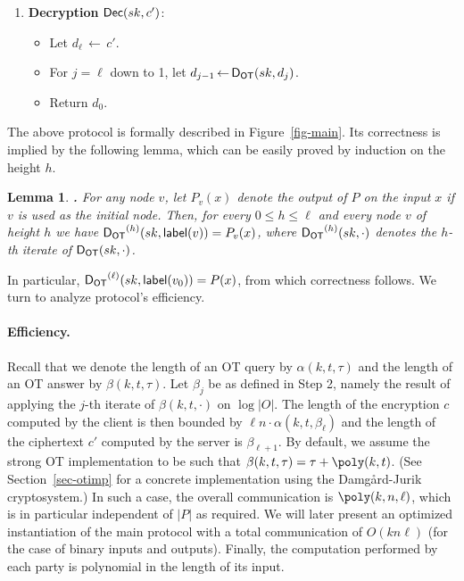 \documentclass[11pt]{article}
\newcommand{\height}{{\sf height}}
\newcommand{\ansot}{{\sf A_{OT}}}
\newcommand{\decot}{{\sf D_{OT}}}
\newcommand{\otl}{{\tau}}
\newcommand{\lab}{{\mathsf{label}}}
\newtheorem{LEMMA}{Lemma}[section]
\newenvironment{lemma}{\begin{LEMMA} \hspace{-.85em} {\bf .} \rm}%
	{\end{LEMMA}}
\newcommand{\from}{{\,\leftarrow\,}}
\newcommand{\dec}{{\sf Dec}}
\begin{document}
{\begin{enumerate}
\begin{itemize}
\begin{itemize}
children are labeled.
\item Let $i\from\psi_V(v)$ and $h\from\height(v)$.
\item Let
$\lab(v)\from \ansot(pk,q_i^h,
\lab(u_0),\ldots,\lab(u_{t-1}))$,
where $u_m$ is the (unique) node such that $m\in{\psi_E(v,u_m)}$.
\\Note that the nodes $u_m$ are not necessarily distinct.
\end{itemize}
\item Return $c'=\lab(v_0)$.
\end{itemize}
\item {\bf Decryption} $\dec(sk,c')$:
\begin{itemize}
\item Let $d_\ell\from c'$.
\item For $j=\ell$ down to 1,
let $d_{j-1}\from\decot(sk, d_j)$.
\item Return $d_0$.
\end{itemize}
\end{enumerate}
}

The above protocol is formally described in Figure~\ref{fig-main}.
Its correctness is implied by the following lemma, which can be
easily proved by induction on the height $h$.
\begin{lemma}
\label{lem-correct} For any node $v$, let $P_v(x)$ denote the output
of $P$ on the input $x$ if $v$ is used as the initial node.  Then,
for every $0\le h\le \ell$ and every node $v$ of height $h$ we have
$\decot^{(h)}(sk,\lab(v))=P_v(x)$, where $\decot^{(h)}(sk,\cdot)$
denotes the $h$-th iterate of $\decot(sk,\cdot)$.
\end{lemma}
In particular, $\decot^{(\ell)}(sk,\lab(v_0))=P(x)$, from which
correctness follows. We turn to analyze protocol's efficiency.

\paragraph{Efficiency.} Recall that we denote the length of an OT query by
$\alpha(k,t,\otl)$ and the length of an OT answer by
$\beta(k,t,\otl)$. Let $\beta_j$ be as defined in Step 2, namely the
result of applying the $j$-th iterate of $\beta(k,t,\cdot)$ on
$\log|O|$. The length of the encryption $c$ computed by the client
is then bounded by $\ell n\cdot\alpha(k,t,\beta_\ell)$ and the
length of the ciphertext $c'$ computed by the server is
$\beta_{\ell+1}$. By default, we assume the strong OT implementation
to be such that $\beta(k,t,\otl)=\otl+\poly(k,t)$. (See
Section~\ref{sec-otimp} for a concrete implementation using the
Damg{\aa}rd-Jurik cryptosystem.) In such a case, the overall
communication is $\poly(k,n,\ell)$, which is in particular
independent of $|P|$ as required.  We will later present an
optimized instantiation of the main protocol with a total
communication of $O(kn\ell)$ (for the case of binary inputs and
outputs). Finally, the computation performed by each party is
polynomial in the length of its input.
\end{document}
